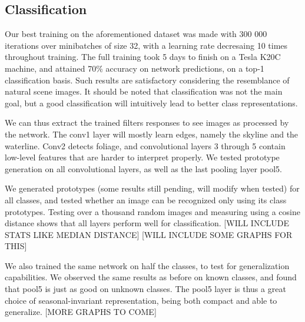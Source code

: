 \subsection{Classification}
Our best training on the aforementioned dataset was made with 300 000 iterations over minibatches of size 32, with a learning rate decresaing 10 times throughout training. The full training took 5 days to finish on a Tesla K20C machine, and attained 70\% accuracy on network predictions, on a top-1 classification basis. Such results are satisfactory considering the resemblance of natural scene images. It should be noted that classification was not the main goal, but a good classification will intuitively lead to better class representations.

We can thus extract the trained filters responses to see images as processed by the network. The conv1 layer will mostly learn edges, namely the skyline and the waterline. Conv2 detects foliage, and convolutional layers 3 through 5 contain low-level features that are harder to interpret properly. We tested prototype generation on all convolutional layers, as well as the last pooling layer pool5.

We generated prototypes (some results still pending, will modify when tested) for all classes, and tested whether an image can be recognized only using its class prototypes. Testing over a thousand random images and measuring using a cosine distance shows that all layers perform well for classification. [WILL INCLUDE STATS LIKE MEDIAN DISTANCE] [WILL INCLUDE SOME GRAPHS FOR THIS]

We also trained the same network on half the classes, to test for generalization capabilities. We observed the same results as before on known classes, and found that pool5 is just as good on unknown classes. The pool5 layer is thus a great choice of seasonal-invariant representation, being both compact and able to generalize. [MORE GRAPHS TO COME]